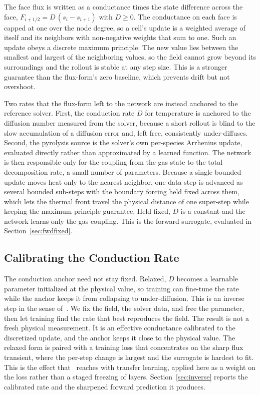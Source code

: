 \documentclass[conference]{IEEEtran}
\begin{document}
The face flux is written as a conductance times the state difference across the
face, $F_{i+1/2} = D\,(s_i - s_{i+1})$ with $D \ge 0$. The conductance on each
face is capped at one over the node degree, so a cell's update is a weighted
average of itself and its neighbors with non-negative weights that sum to one.
Such an update obeys a discrete maximum principle. The new value lies between the
smallest and largest of the neighboring values, so the field cannot grow beyond
its surroundings and the rollout is stable at any step size. This is a stronger
guarantee than the flux-form's zero baseline, which prevents drift but not
overshoot.

Two rates that the flux-form left to the network are instead anchored to the
reference solver. First, the conduction rate $D$ for temperature is anchored to the
diffusion number measured from the solver, because a short rollout is blind to the
slow accumulation of a diffusion error and, left free, consistently under-diffuses.
Second, the pyrolysis source is the solver's own per-species Arrhenius update,
evaluated directly rather than approximated by a learned function. The network is
then responsible only for the coupling from the gas state to the total decomposition
rate, a small number of parameters. Because a single bounded update moves heat only
to the nearest neighbor, one data step is advanced as several bounded sub-steps with
the boundary forcing held fixed across them, which lets the thermal front travel the
physical distance of one super-step while keeping the maximum-principle guarantee.
Held fixed, $D$ is a constant and the network learns only the gas coupling. This is
the forward surrogate, evaluated in Section~\ref{sec:fwdfixed}.

\subsection{Calibrating the Conduction Rate}
\label{sec:invmethod}
The conduction anchor need not stay fixed. Relaxed, $D$ becomes a learnable
parameter initialized at the physical value, so training can fine-tune the rate
while the anchor keeps it from collapsing to under-diffusion. This is an inverse step
in the sense of~\cite{cao2026}. We fix the field, the solver data, and free the
parameter, then let training find the rate that best reproduces the field. The result
is not a fresh physical measurement. It is an effective conductance calibrated to the
discretized update, and the anchor keeps it close to the physical value. The relaxed
form is paired with a training loss that concentrates on the sharp flux transient,
where the per-step change is largest and the surrogate is hardest to fit. This is the
effect that~\cite{cao2026} reaches with transfer learning, applied here as a weight on
the loss rather than a staged freezing of layers. Section~\ref{sec:inverse} reports
the calibrated rate and the sharpened forward prediction it produces.
\end{document}
